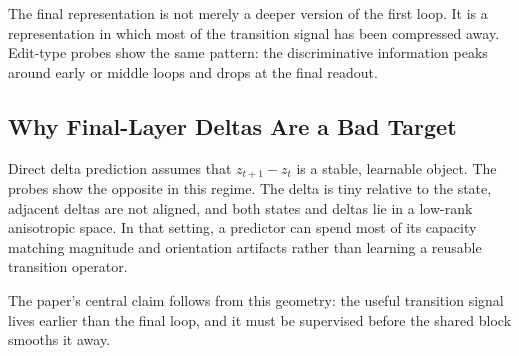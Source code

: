 The final representation is not merely a deeper version of the first
loop.  It is a representation in which most of the transition signal has
been compressed away.  Edit-type probes show the same pattern: the
discriminative information peaks around early or middle loops and drops
at the final readout.

\subsection{Why Final-Layer Deltas Are a Bad Target}

Direct delta prediction assumes that $z_{t+1}-z_t$ is a stable,
learnable object.  The probes show the opposite in this regime.  The
delta is tiny relative to the state, adjacent deltas are not aligned,
and both states and deltas lie in a low-rank anisotropic space.  In that
setting, a predictor can spend most of its capacity matching magnitude
and orientation artifacts rather than learning a reusable transition
operator.

The paper's central claim follows from this geometry: the useful
transition signal lives earlier than the final loop, and it must be
supervised before the shared block smooths it away.
